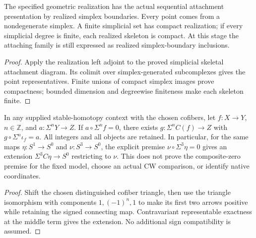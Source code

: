 \begin{proposition}
  \label{prop:realized-finite-simplicial-skeleta}
  \leanok
  The specified geometric realization has the actual sequential
  attachment presentation by realized simplex boundaries. Every point
  comes from a nondegenerate simplex. A finite simplicial set has
  compact realization; if every simplicial degree is finite, each
  realized skeleton is compact. At this stage the attaching family
  is still expressed as realized simplex-boundary inclusions.
\end{proposition}
\begin{proof}
  Apply the realization left adjoint to the proved simplicial
  skeletal attachment diagram. Its colimit over simplex-generated
  subcomplexes gives the point representatives. Finite unions of
  compact simplex images prove compactness; bounded dimension and
  degreewise finiteness make each skeleton finite.
  \leanok
\end{proof}

\begin{proposition}
  \label{prop:shifted-cofiber-extension}
  \leanok
  In any supplied stable-homotopy context with the chosen cofibers, let
  $f:X\to Y$, $n\in\mathbb Z$, and $a:\Sigma^nY\to Z$. If
  $a\circ\Sigma^nf=0$, there exists $g:\Sigma^nC(f)\to Z$ with
  $g\circ\Sigma^n\iota_f=a$. All integers and all objects are retained.
  In particular, for the same maps $\eta:S^1\to S^0$ and
  $\nu:S^3\to S^0$, the explicit premise
  $\nu\circ\Sigma^3\eta=0$ gives an extension
  $\Sigma^3C\eta\to S^0$ restricting to $\nu$.
  This does not prove the composite-zero premise for the fixed model,
  choose an actual CW comparison, or identify native coordinates.
\end{proposition}
\begin{proof}
  \leanok
  Shift the chosen distinguished cofiber triangle, then use the triangle
  isomorphism with components $1,(-1)^n,1$ to make its first two arrows
  positive while retaining the signed connecting map. Contravariant
  representable exactness at the middle term gives the extension.
  No additional sign compatibility is assumed.
\end{proof}

